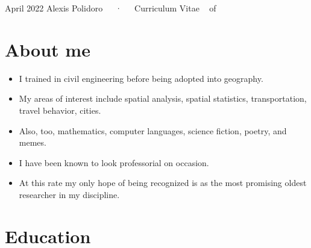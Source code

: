 \documentclass[11pt,a4paper,]{awesome-cv}
\providecommand{\tightlist}{%
	\setlength{\itemsep}{0pt}\setlength{\parskip}{0pt}}
\begin{document}
\makecvheader

\makecvfooter
  {April 2022}
    {Alexis Polidoro~~~·~~~Curriculum Vitae}
  {\thepage~ of \pageref{LastPage}~}





\hypertarget{about-me}{%
\section{About me}\label{about-me}}

\begin{itemize}
\tightlist
\item
  I trained in civil engineering before being adopted into geography.
\item
  My areas of interest include spatial analysis, spatial statistics,
  transportation, travel behavior, cities.
\item
  Also, too, mathematics, computer languages, science fiction, poetry,
  and memes.
\item
  I have been known to look professorial on occasion.
\item
  At this rate my only hope of being recognized is as the most promising
  oldest researcher in my discipline.
\end{itemize}

\hypertarget{education}{%
\section{Education}\label{education}}

\begin{cventries}
\end{cventries}
\end{document}

